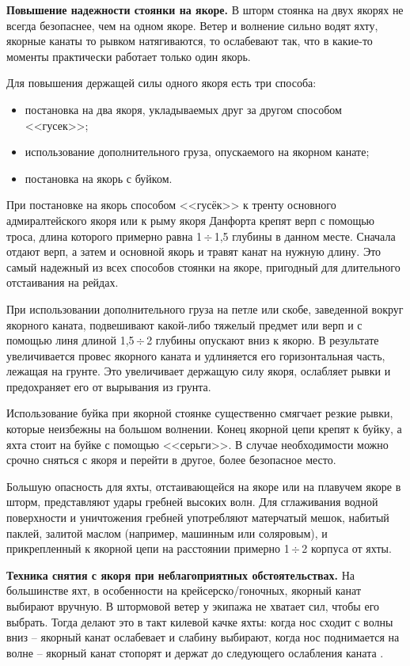 \documentclass[a4paper, 12pt, twoside, final, book, russian, fittopage, cyremdash]{ncc}
\newcommand{\otdo}{\,\ensuremath{\div}\,}
\begin{document}
\textbf{Повышение надежности стоянки на якоре.} В шторм стоянка на двух якорях не всегда безопаснее, чем на одном якоре. Ветер и волнение сильно водят яхту, якорные канаты то рывком натягиваются, то ослабевают так, что в какие-то моменты практически работает только один якорь.

Для повышения держащей силы одного якоря есть три способа: 
\begin{itemize}
\item постановка на два якоря, укладываемых друг за другом способом <<гусек>>; 
\item использование дополнительного груза, опускаемого на якорном канате; 
\item постановка на якорь с буйком. 
\end{itemize}

При постановке на якорь способом <<гусёк>> к тренту основного адмиралтейского якоря или к рыму якоря Данфорта крепят верп с помощью троса, длина которого примерно равна 1\otdo 1,5 глубины в данном месте. Сначала отдают верп, а затем и основной якорь и травят канат на нужную длину. Это самый надежный из всех способов стоянки на якоре, пригодный для длительного отстаивания на рейдах.

При использовании дополнительного груза на петле или скобе, заведенной вокруг якорного каната, подвешивают какой-либо тяжелый предмет или верп и с помощью линя длиной 1,5\otdo 2 глубины опускают вниз к якорю. В результате увеличивается провес якорного каната и удлиняется его горизонтальная часть, лежащая на грунте. Это увеличивает держащую силу якоря, ослабляет рывки и предохраняет его от вырывания из грунта.

Использование буйка при якорной стоянке существенно смягчает резкие рывки, которые неизбежны на большом волнении. Конец якорной цепи крепят к буйку, а яхта стоит на буйке с помощью <<серьги>>. В случае необходимости можно срочно сняться с якоря и перейти в другое, более безопасное место.

Большую опасность для яхты, отстаивающейся на якоре или на плавучем якоре в шторм, представляют удары гребней высоких волн. Для сглаживания водной поверхности и уничтожения гребней употребляют матерчатый мешок, набитый паклей, залитой маслом (например, машинным или соляровым), и прикрепленный к якорной цепи на расстоянии примерно 1\otdo 2 корпуса от яхты. 

\textbf{Техника снятия с якоря при неблагоприятных обстоятельствах.} На большинстве яхт, в особенности на крейсерско\-/гоночных, якорный канат выбирают вручную. В штормовой ветер у экипажа не хватает сил, чтобы его выбрать. Тогда делают это в такт килевой качке яхты: когда нос сходит с волны вниз \--- якорный канат ослабевает и слабину выбирают, когда нос поднимается на волне \--- якорный канат стопорят и держат до следующего ослабления каната . 
\end{document}
